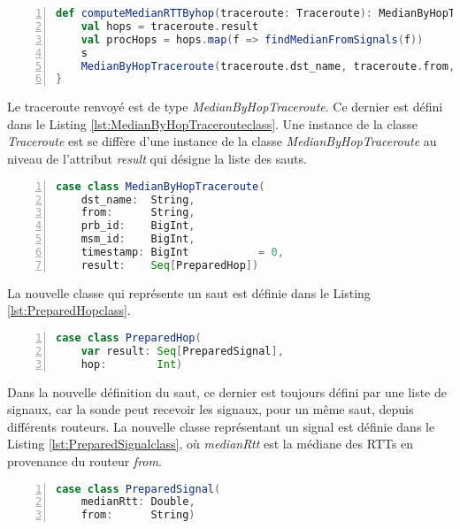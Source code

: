 \begin{lstlisting}[language=scala,firstnumber=1, caption={Définition de la fonction computeMedianRTTByhop},label={lst:computeMedianRTTByhopFunction}, basicstyle = \footnotesize,escapechar=|,numbers=left,
stepnumber=1]  
  def computeMedianRTTByhop(traceroute: Traceroute): MedianByHopTraceroute = {
	val hops = traceroute.result
	val procHops = hops.map(f => findMedianFromSignals(f))
	s
	MedianByHopTraceroute(traceroute.dst_name, traceroute.from, traceroute.prb_id, traceroute.msm_id, traceroute.timestamp, procHops)
}
\end{lstlisting}

Le traceroute renvoyé est de type \textit{MedianByHopTraceroute}. Ce dernier est défini dans le Listing \ref{lst:MedianByHopTracerouteclass}. Une instance de la classe \textit{Traceroute} est se diffère  d'une instance de la classe \textit{MedianByHopTraceroute} au niveau de l'attribut \textit{result} qui désigne la liste des sauts.
\begin{lstlisting}[language=scala,firstnumber=1, caption={Définition de la classe MedianByHopTraceroute},label={lst:MedianByHopTracerouteclass}, basicstyle = \footnotesize,escapechar=|,numbers=left,
stepnumber=1] 
case class MedianByHopTraceroute(
	dst_name:  String,
	from:      String,
	prb_id:    BigInt,
	msm_id:    BigInt,
	timestamp: BigInt           = 0,
	result:    Seq[PreparedHop])
\end{lstlisting}

La nouvelle classe qui représente un saut est définie dans le Listing \ref{lst:PreparedHopclass}.
\begin{lstlisting}[language=scala,firstnumber=1, caption={Définition de la classe PreparedHop},label={lst:PreparedHopclass}, basicstyle = \footnotesize,escapechar=|,numbers=left,
stepnumber=1] 
case class PreparedHop(
	var result: Seq[PreparedSignal],
	hop:        Int)
\end{lstlisting}

Dans la nouvelle définition du saut, ce dernier est toujours défini par une liste de signaux, car la sonde peut recevoir les signaux, pour un même saut, depuis différents routeurs. La nouvelle classe représentant un signal est définie dans le Listing \ref{lst:PreparedSignalclass}, où \textit{medianRtt} est la médiane des RTTs en provenance du routeur \textit{from}. 
\begin{lstlisting}[language=scala,firstnumber=1, caption={Définition de la classe PreparedSignal},label={lst:PreparedSignalclass}, basicstyle = \footnotesize,escapechar=|,numbers=left,
stepnumber=1] 
case class PreparedSignal(
	medianRtt: Double,
	from:      String)
\end{lstlisting}

